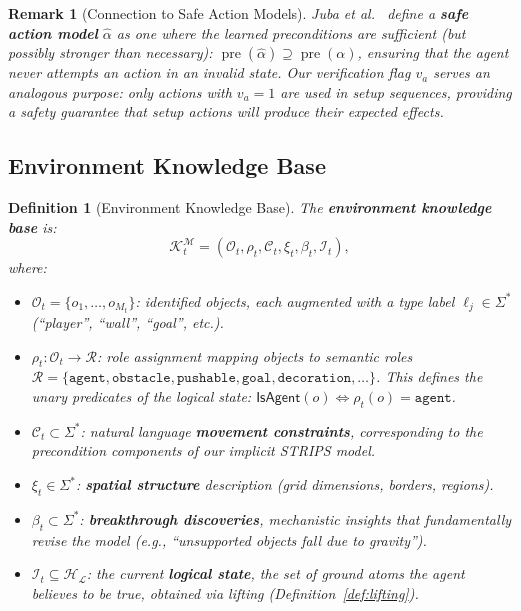 \documentclass{article}
\newtheorem{definition}{Definition}
\newtheorem{remark}{Remark}
\DeclareMathOperator{\pre}{pre}
\newcommand{\calO}{\mathcal{O}}
\newcommand{\calC}{\mathcal{C}}
\newcommand{\calH}{\mathcal{H}}
\newcommand{\calI}{\mathcal{I}}
\newcommand{\calK}{\mathcal{K}}
\newcommand{\calL}{\mathcal{L}}
\newcommand{\calM}{\mathcal{M}}
\newcommand{\calR}{\mathcal{R}}
\begin{document}
\begin{remark}[Connection to Safe Action Models]
\label{rem:sam}
Juba et al.~\cite{juba2021safe} define a \textbf{safe action model} $\hat{\alpha}$ as one where the learned preconditions are sufficient (but possibly stronger than necessary): $\pre(\hat{\alpha}) \supseteq \pre(\alpha)$, ensuring that the agent never attempts an action in an invalid state.  Our verification flag $v_a$ serves an analogous purpose: only actions with $v_a = 1$ are used in setup sequences, providing a safety guarantee that setup actions will produce their expected effects.
\end{remark}

\subsection{Environment Knowledge Base}
\label{sec:env_kb}

\begin{definition}[Environment Knowledge Base]
\label{def:env_kb}
The \textbf{environment knowledge base} is:
\begin{equation}
\calK^{\calM}_t = (\calO_t, \rho_t, \calC_t, \xi_t, \beta_t, \calI_t),
\end{equation}
where:
\begin{itemize}[nosep]
    \item $\calO_t = \{o_1, \ldots, o_{M_t}\}$: identified objects, each augmented with a type label $\ell_j \in \Sigma^*$ (``player'', ``wall'', ``goal'', etc.).
    \item $\rho_t : \calO_t \to \calR$: role assignment mapping objects to semantic roles $\calR = \{\texttt{agent}, \texttt{obstacle}, \texttt{pushable}, \texttt{goal}, \texttt{decoration}, \ldots\}$.  This defines the unary predicates of the logical state: $\mathsf{IsAgent}(o) \iff \rho_t(o) = \texttt{agent}$.
    \item $\calC_t \subset \Sigma^*$: natural language \textbf{movement constraints}, corresponding to the precondition components of our implicit STRIPS model.
    \item $\xi_t \in \Sigma^*$: \textbf{spatial structure} description (grid dimensions, borders, regions).
    \item $\beta_t \subset \Sigma^*$: \textbf{breakthrough discoveries}, mechanistic insights that fundamentally revise the model (e.g., ``unsupported objects fall due to gravity'').
    \item $\calI_t \subseteq \calH_\calL$: the current \textbf{logical state}, the set of ground atoms the agent believes to be true, obtained via lifting (Definition~\ref{def:lifting}).
\end{itemize}
\end{definition}
\end{document}
